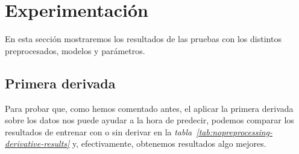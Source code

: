 \section{Experimentación}

En esta sección mostraremos los resultados de las pruebas con los distintos preprocesados, modelos y parámetros.

\subsection{Primera derivada}

Para probar que, como hemos comentado antes, el aplicar la primera derivada sobre los datos nos puede ayudar a la hora de predecir, podemos comparar los resultados de entrenar con o sin derivar en la \textit{tabla\ \ref{tab:nopreprocessing-derivative-results}} y, efectivamente, obtenemos resultados algo mejores.

